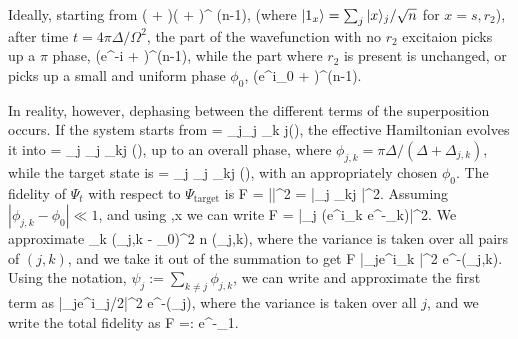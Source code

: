 Ideally, starting from 
\bel
	\Big( + \Big)\Big( + \Big)^{\otimes
	(n-1)},
\eel
(where $| 1_x \rangle = \sum_j| x \rangle_j/\sqrt{n}$ for $x=s,r_2$),
after time $t = 4\pi\Delta/\Omega^2$, the part
of the wavefunction with no $r_2$ excitaion picks up a $\pi$ phase, 
\bel
	\Big(e^{-i\pi} + \Big)^{\otimes (n-1)},
\eel
while the part
where $r_2$ is present is unchanged, or
picks up a small and uniform phase $\phi_0$,
\bel
	\Big(e^{i\phi_0} + \Big)^{\otimes (n-1)}.
\eel

In reality, however, dephasing between the different terms of the superposition
occurs. If the system starts from
\bel
	 = \sum_j_j \bigotimes_{k\neq
	j}\left(\right),
\eel
the effective Hamiltonian evolves it into 
\bel
	 = \sum_j _j
	\bigotimes_{k\neq j} \left(\right),
\eel
up to an overall phase, where $\phi_{j,k} = \pi\Delta/(\Delta + \Delta_{j,k})$,
while the target state is
\bel
	 = \sum_j _j
	\bigotimes_{k\neq j} \left(\right),
\eel
with an appropriately chosen $\phi_0$. The fidelity of $\Psi_t$ with respect to
$\Psi_\mathrm{target}$ is
\bel
	F = ||^2 = \left|\sum_j
	\prod_{k\neq j} \right|^2.
\eel
Assuming $|\phi_{j,k} - \phi_0| \ll 1$, and using
\bel
	 \approx \exp{},\qquad {}\quad x
\eel
we can write
\bel
	F = \left|\sum_j \left(e^{i\sum_k }
	\times e^{-\sum_k}\right)\right|^2.
\eel
We approximate
\bel
	\sum_k (\phi_j,k - \phi_0)^2 \approx n
	\left(\phi_{j,k}\right),
\eel
where the variance is taken over all pairs of $(j,k)$, and we take it out of the
summation to get
\bel
	F \approx \left|\sum_je^{i\sum_k
	}\right|^2
	e^{-(\phi_{j,k})}.
\eel
Using the notation,
$\psi_j := \sum_{k\neq j} \phi_{j,k}$, we can write and approximate the first
term as
\bel
	\left|\sum_je^{i\psi_j/2}\right|^2 \approx
	e^{-(\psi_j)},
\eel 
where the variance is taken over all $j$, and we write the total fidelity as
\bel
	F \approx \exp{} =: e^{-\eps_1}.
\eel

